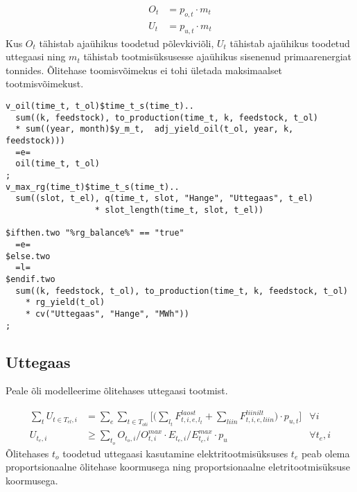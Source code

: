 \documentclass[10pt,a4paper]{article}
\begin{document}
\begin{align}
O_{t} &= p_{o,t} \cdot m_t \\
U_{t} &= p_{u,t} \cdot m_t 
\end{align}
Kus $O_t$ tähistab ajaühikus toodetud põlevkiviõli, $U_t$ tähistab ajaühikus toodetud uttegaasi ning $m_t$ tähistab tootmisüksusesse ajaühikus sisenenud primaarenergiat tonnides. Õlitehase toomisvõimekus ei tohi ületada maksimaalset tootmisvõimekust.

\begin{verbatim}
v_oil(time_t, t_ol)$time_t_s(time_t)..
  sum((k, feedstock), to_production(time_t, k, feedstock, t_ol)
  * sum((year, month)$y_m_t,  adj_yield_oil(t_ol, year, k, feedstock)))
  =e=
  oil(time_t, t_ol)
;
v_max_rg(time_t)$time_t_s(time_t)..
  sum((slot, t_el), q(time_t, slot, "Hange", "Uttegaas", t_el)
                  * slot_length(time_t, slot, t_el))

$ifthen.two "%rg_balance%" == "true"
  =e=
$else.two
  =l=
$endif.two
  sum((k, feedstock, t_ol), to_production(time_t, k, feedstock, t_ol)
    * rg_yield(t_ol)
    * cv("Uttegaas", "Hange", "MWh"))
;
\end{verbatim}

\subsection{Uttegaas}
Peale õli modelleerime õlitehases uttegaasi tootmist.

\begin{align}
\sum_t U_{t\in T_{el},i} &= \sum_e \sum_{t\in T_{oli}} \bigg[ \bigg(\sum_{l_t} F^{laost}_{t,i,e,l_t} + \sum_{liin} F^{liinilt}_{t,i,e,liin}\bigg)\cdot  p_{u,t}\bigg] &\forall i \\
U_{t_e,i} &\geq \sum_{t_o} O_{t_o,i}/O^{max}_{t,i} \cdot E_{t_e,i} / E^{max}_{t_e,i}\cdot p_{u} &\forall t_e,i
\end{align}
Õlitehases $t_o$ toodetud uttegaasi kasutamine elektritootmisüksuses $t_e$ peab olema  proportsionaalne õlitehase koormusega ning proportsionaalne eletritootmisüksuse koormusega.
\end{document}
